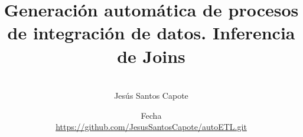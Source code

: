 \documentclass[12pt,oneside]{uhthesis}
\title{Generación automática de procesos de integración de datos. Inferencia de Joins}
\author{\\\vspace{0.25cm}Jes\'us Santos Capote}
\date{Fecha\\\vspace{0.25cm}\href{https://github.com/username/repo}{https://github.com/JesusSantosCapote/autoETL.git}}
\begin{document}
\frontmatter
\maketitle







\mainmatter























\nocite{powercenter1}

\backmatter





\end{document}
